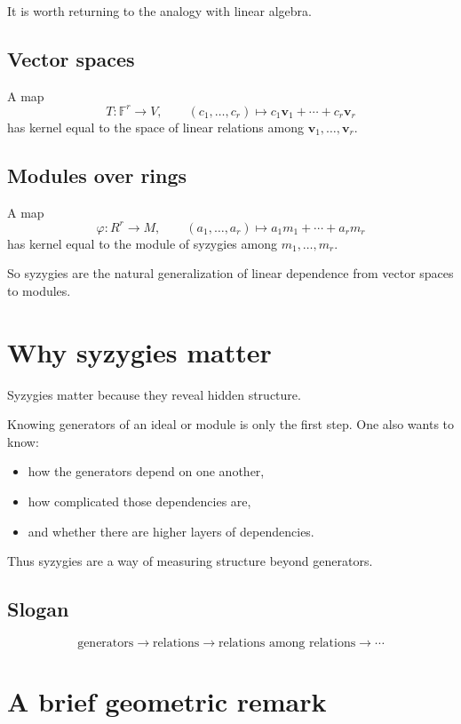 \documentclass[11pt]{article}
\theoremstyle{definition}
\theoremstyle{remark}
\newcommand{\F}{\mathbb{F}}
\begin{document}
	It is worth returning to the analogy with linear algebra.
	
	\subsection{Vector spaces}
	
	A map
	\[
	T:\F^r\to V,
	\qquad
	(c_1,\dots,c_r)\mapsto c_1\textbf{v}_1+\cdots+c_r\textbf{v}_r
	\]
	has kernel equal to the space of linear relations among \(\textbf{v}_1,\dots,\textbf{v}_r\).
	
	\subsection{Modules over rings}
	
	A map
	\[
	\varphi:R^r\to M,
	\qquad
	(a_1,\dots,a_r)\mapsto a_1m_1+\cdots+a_rm_r
	\]
	has kernel equal to the module of syzygies among \(m_1,\dots,m_r\).
	
	So syzygies are the natural generalization of linear dependence from vector spaces to modules.
	
	\section{Why syzygies matter}
	
	Syzygies matter because they reveal hidden structure.
	
	Knowing generators of an ideal or module is only the first step. One also wants to know:
	
	\begin{itemize}[leftmargin=2em]
		\item how the generators depend on one another,
		\item how complicated those dependencies are,
		\item and whether there are higher layers of dependencies.
	\end{itemize}
	
	Thus syzygies are a way of measuring structure beyond generators.
	
	\subsection*{Slogan}
	\[
	\text{generators} \longrightarrow \text{relations} \longrightarrow \text{relations among relations} \longrightarrow \cdots
	\]
	
	\section{A brief geometric remark}
	
\end{document}
